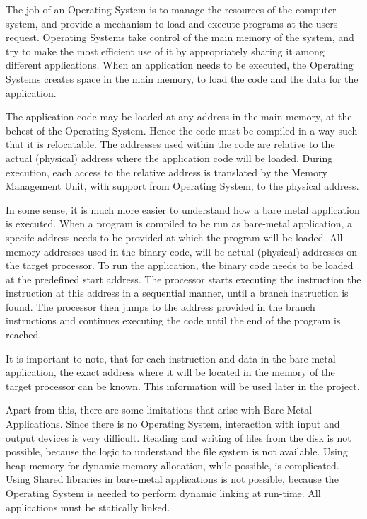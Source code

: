 The job of an Operating System is to manage the resources of the computer system, and provide a mechanism to load and execute programs at the users request. Operating Systems take control of the main memory of the system, and try to make the most efficient use of it by appropriately sharing it among different applications. When an application needs to be executed, the Operating Systems creates space in the main memory, to load the code and the data for the application.

The application code may be loaded at any address in the main memory, at the behest of the Operating System. Hence the code must be compiled in a way such that it is relocatable. The addresses used within the code are relative to the actual (physical) address where the application code will be loaded. During execution, each access to the relative address is translated by the Memory Management Unit, with support from Operating System, to the physical address.

In some sense, it is much more easier to understand how a bare metal application is executed. When a program is compiled to be run as bare-metal application, a specifc address needs to be provided at which the program will be loaded. All memory addresses used in the binary code, will be actual (physical) addresses on the target processor. To run the application, the binary code needs to be loaded at the predefined start address. The processor starts executing the instruction the instruction at this address in a sequential manner, until a branch instruction is found. The processor then jumps to the address provided in the branch instructions and continues executing the code until the end of the program is reached.

It is important to note, that for each instruction and data in the bare metal application, the exact address where it will be located in the memory of the target processor can be known. This information will be used later in the project.

Apart from this, there are some limitations that arise with Bare Metal Applications. Since there is no Operating System, interaction with input and output devices is very difficult. Reading and writing of files from the disk is not possible, because the logic to understand the file system is not available. Using heap memory for dynamic memory allocation, while possible, is complicated. Using Shared libraries in bare-metal applications is not possible, because the Operating System is needed to perform dynamic linking at run-time. All applications must be statically linked.

